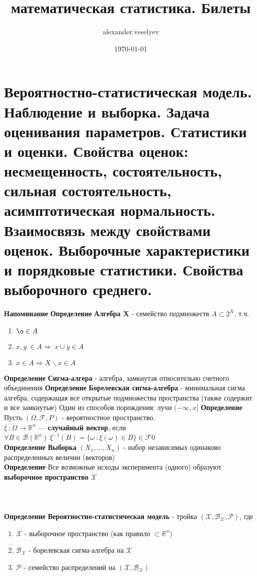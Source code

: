 \documentclass[25pt]{article}
\title{математическая статистика. Билеты}
\author{alexander.veselyev }
\date{\today}
\begin{document}
\section{Вероятностно-статистическая модель. Наблюдение и выборка. Задача оценивания
параметров. Статистики и оценки. Свойства оценок: несмещенность, состоятельность, сильная состоятельность, асимптотическая нормальность. Взаимосвязь между
свойствами оценок. Выборочные характеристики и порядковые статистики. 
Свойства выборочного среднего.}

\textbf{Напоминание}
\newline
\textbf{Определение} \textbf{Алгебра X} - семейство подмножеств $A \subset 2^X$, т.ч.
\begin{enumerate}
    \item $\o \in A$
    \item $x, y \ \in A \Rightarrow \ x \cup y \in A$
    \item $x \in A \Rightarrow X \backslash x \in A$
\end{enumerate}
\textbf{Определение} \textbf{Сигма-алгера} - алгебра, замкнутая относительно счетного объединения
\newline
\textbf{Определение} \textbf{Борелевская сигма-алгебра} - минимальная сигма алгебра, содержащая все
открытые подмножества пространства (также содержит и все замкнутые)\newline
Один из способов порождения: лучи $(-\infty, x]$
\newline
\textbf{Определение} Пусть $(\Omega, \mathcal{F}, P)$ - вероятностное пространство.
\\ $\xi\ : \Omega \rightarrow \mathbb{R}^n$ --- \textbf{случайный вектор}, если
$\forall B \in \mathcal{B}(\mathbb{R}^n)\ \xi^{-1}(B) = \{\omega\ : \xi(\omega) \in B\} \in \mathcal{F}$0
\\
\textbf{Определение} \textbf{Выборка} $(X_1,\dots,X_n)$ - набор независимых одинаково распределенных величин
(векторов)
\\
\textbf{Определение} Все возможные исходы эксперимента (одного) образуют \textbf{выборочное пространство} $\mathcal{X}$ 
\\ \\ \\ \\
\textbf{Определение} \textbf{Вероятностно-статистическая модель} - тройка $(\mathcal{X}, \mathcal{B}_\mathcal{X}, \mathcal{P})$, где
\begin{enumerate}
    \item $\mathcal{X}$ - выборочное пространство (как правило $\subset \mathbb{R}^n$)
    \item $\mathcal{B}_\mathcal{X}$ - борелевская сигма-алгебра на $\mathcal{X}$ 
    \item $\mathcal{P}$ - семейство распределений на $(\mathcal{X}, \mathcal{B}_\mathcal{X})$
\end{enumerate}
\end{document}
